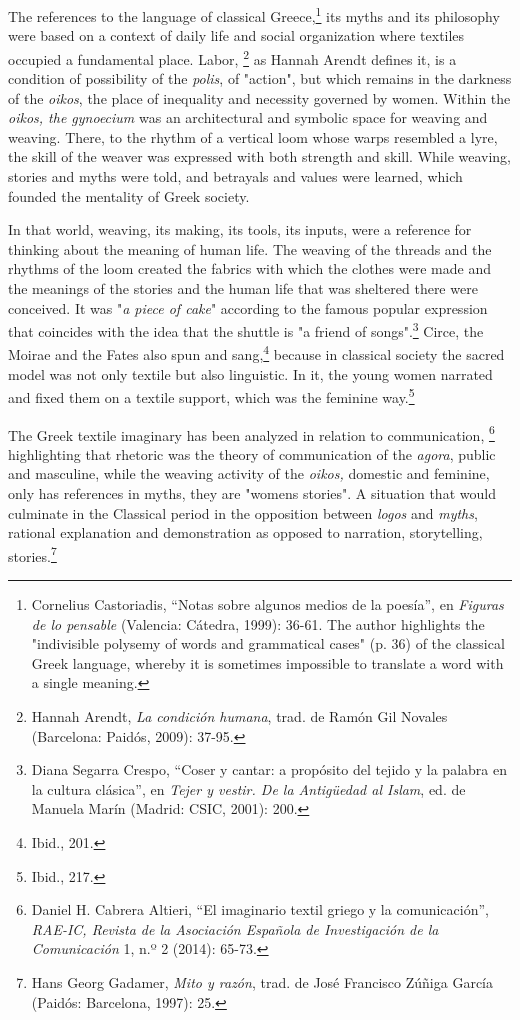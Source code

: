 \documentclass{tufte-handout}
\begin{document}
The references to the language of classical Greece,\footnote{Cornelius
  Castoriadis, ``Notas sobre algunos medios de la poesía'', en
  \emph{Figuras de lo pensable} (Valencia: Cátedra, 1999): 36-61. The
  author highlights the "indivisible polysemy of words and grammatical
  cases" (p. 36) of the classical Greek language, whereby it is
  sometimes impossible to translate a word with a single meaning.} its
myths and its philosophy were based on a context of daily life and
social organization where textiles occupied a fundamental place. Labor,
\footnote{Hannah Arendt, \emph{La condición humana}, trad. de Ramón Gil
  Novales (Barcelona: Paidós, 2009): 37-95.} as Hannah Arendt defines
it, is a condition of possibility of the \emph{polis}, of "action", but
which remains in the darkness of the \emph{oikos}, the place of
inequality and necessity governed by women. Within the \emph{oikos, the
gynoecium} was an architectural and symbolic space for weaving and
weaving. There, to the rhythm of a vertical loom whose warps resembled a
lyre, the skill of the weaver was expressed with both strength and
skill. While weaving, stories and myths were told, and betrayals and
values were learned, which founded the mentality of Greek society.

In that world, weaving, its making, its tools, its inputs, were a
reference for thinking about the meaning of human life. The weaving of
the threads and the rhythms of the loom created the fabrics with which
the clothes were made and the meanings of the stories and the human life
that was sheltered there were conceived. It was "\emph{a piece of cake}"
according to the famous popular expression that coincides with the idea
that the shuttle is "a friend of songs".\footnote{Diana Segarra Crespo,
  ``Coser y cantar: a propósito del tejido y la palabra en la cultura
  clásica'', en \emph{Tejer y vestir. De la Antigüedad al Islam}, ed. de
  Manuela Marín (Madrid: CSIC, 2001): 200.} Circe, the Moirae and the
Fates also spun and sang,\footnote{Ibid., 201.} because in classical
society the sacred model was not only textile but also linguistic. In
it, the young women narrated and fixed them on a textile support, which
was the feminine way.\footnote{Ibid., 217.}

The Greek textile imaginary has been analyzed in relation to
communication, \footnote{Daniel H. Cabrera Altieri, ``El imaginario
  textil griego y la comunicación'', \emph{RAE-IC, Revista de la
  Asociación Española de Investigación de la Comunicación} 1, n.º 2
  (2014): 65-73.} highlighting that rhetoric was the theory of
communication of the \emph{agora}, public and masculine, while the
weaving activity of the \emph{oikos,} domestic and feminine, only has
references in myths, they are "women\textquotesingle s stories". A
situation that would culminate in the Classical period in the opposition
between \emph{logos} and \emph{myths}, rational explanation and
demonstration as opposed to narration, storytelling, stories.\footnote{Hans
  Georg Gadamer, \emph{Mito y razón}, trad. de José Francisco Zúñiga
  García (Paidós: Barcelona, 1997): 25.}
\end{document}
